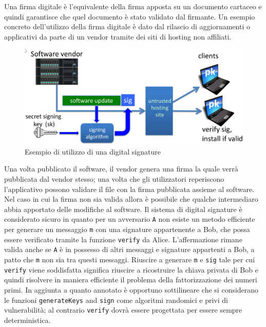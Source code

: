 Una firma digitale è l'equivalente della firma apposta su un documento cartaceo e quindi garantisce che quel documento è stato validato dal firmante. Un esempio concreto dell'utilizzo della firma digitale è dato dal rilascio di aggiornamenti o applicativi da parte di un vendor tramite dei siti di hosting non affiliati.

\begin{figure}
    \centering
    \includegraphics[scale=0.7]{images/digitalsignature.png}
    \caption{Esempio di utilizzo di una digital signature}
\end{figure}

Una volta pubblicato il software, il vendor genera una firma la quale verrà pubblicata dal vendor stesso; una volta che gli utilizzatori reperiscono l'applicativo possono validare il file con la firma pubblicata assieme al software. Nel caso in cui la firma non sia valida allora è possibile che qualche intermediaro abbia apportato delle modifiche al software.\newline\newline
Il sistema di digital signature è considerato sicuro in quanto per un avversario \texttt{A} non esiste un metodo efficiente per generare un messaggio \texttt{m} con una signature appartenente a Bob, che possa essere verificato tramite la funzione \texttt{verify} da Alice. L'affermazione rimane valida anche se \texttt{A} è in possesso di altri messaggi e signature appartenti a Bob, a patto che \texttt{m} non sia tra questi messaggi.\newline
Riuscire a generare \texttt{m} e \texttt{sig} tale per cui \texttt{verify} viene soddisfatta significa riuscire a ricostruire la chiava privata di Bob e quindi risolvere in maniera efficiente il problema della fattorizzazione dei numeri primi.\newline\newline
In aggiunta a quanto annotato è opportuno sottilineare che si considerano le funzioni \texttt{generateKeys} and \texttt{sign} come algoritmi randomici e privi di vulnerabilità; al contrario \texttt{verify} dovrà essere progettata per essere sempre deterministica.

